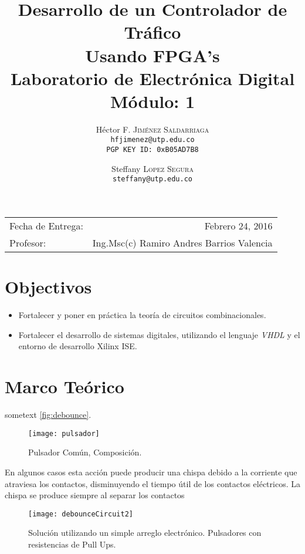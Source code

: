 \documentclass[paper=a4, fontsize=12pt]{article} 		%
\title{Desarrollo de un Controlador de Tráfico\\ 
Usando FPGA's \\
Laboratorio de Electrónica Digital\\Módulo: 1} 			%
\author{												%
Héctor F. \textsc{Jiménez Saldarriaga}\\
\texttt{hfjimenez@utp.edu.co} \\
\texttt{PGP KEY ID: 0xB05AD7B8}
\and
Steffany \textsc{Lopez Segura}\\
\texttt{steffany@utp.edu.co}
} 												       %
\date{}    						                       %
\numberwithin{equation}{section}						%
\numberwithin{table}{section} 							%
\begin{document}
\maketitle                      			           %
\begin{center}
\begin{tabular}{l r}								   %
Fecha de Entrega: & Febrero 24, 2016 \\				   %
Profesor: & Ing.Msc(c) Ramiro Andres Barrios Valencia
\end{tabular}
\end{center}
\section{Objectivos}
\begin{itemize}
  \item Fortalecer y poner en práctica la teoría de circuitos combinacionales.
  \item Fortalecer el desarrollo de sistemas digitales, utilizando el lenguaje \emph{VHDL} y el entorno de desarrollo Xilinx ISE.
\end{itemize}

\section{Marco Teórico}
\label{sec:problemamecanico}
sometext \ref{fig:debounce}.\\
\begin{figure}[H]
  \centering
     \texttt{[image: pulsador]}
  \caption{Pulsador Común, Composición.}
      \label{fig:pulsador}
\end{figure}

\label{sec:pulsador} 
En algunos casos esta acción puede producir una chispa debido a la corriente que atraviesa los contactos, disminuyendo el tiempo útil de los contactos eléctricos. La chispa se produce siempre al separar los contactos 
\begin{figure}[H]
  \centering
     \texttt{[image: debounceCircuit2]}
  \caption{Solución utilizando un simple arreglo electrónico. Pulsadores con resistencias de Pull Ups.}
      \label{fig:hardwc}
\end{figure}
\end{document}

